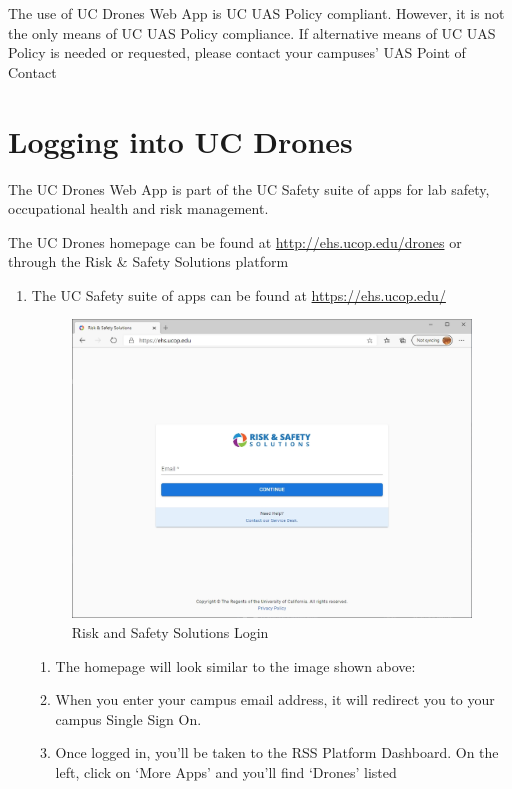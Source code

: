 \documentclass[
]{book}
\providecommand{\tightlist}{%
  \setlength{\itemsep}{0pt}\setlength{\parskip}{0pt}}
\begin{document}
The use of UC Drones Web App is UC UAS Policy compliant. However, it is not the only means of UC UAS Policy compliance. If alternative means of UC UAS Policy is needed or requested, please contact your campuses' UAS Point of Contact

\hypertarget{ch-UCdrones-login}{%
\chapter{Logging into UC Drones}\label{ch-UCdrones-login}}

The UC Drones Web App is part of the UC Safety suite of apps for lab safety, occupational health and risk management.

The UC Drones homepage can be found at \url{http://ehs.ucop.edu/drones} or through the Risk \& Safety Solutions platform

\begin{enumerate}
\def\labelenumi{\arabic{enumi}.}
\item
  The UC Safety suite of apps can be found at \url{https://ehs.ucop.edu/}

  \begin{figure}

   {\centering \includegraphics[width=0.85\linewidth]{images/RSS_home} 

   }

   \caption{Risk and Safety Solutions Login}\label{fig:rss-web}
   \end{figure}

  \begin{enumerate}
  \def\labelenumii{\arabic{enumii}.}
  \tightlist
  \item
    The homepage will look similar to the image shown above:
  \item
    When you enter your campus email address, it will redirect you to your campus Single Sign On.
  \item
    Once logged in, you'll be taken to the RSS Platform Dashboard. On the left, click on `More Apps' and you'll find `Drones' listed
  \end{enumerate}
\end{enumerate}
\end{document}
